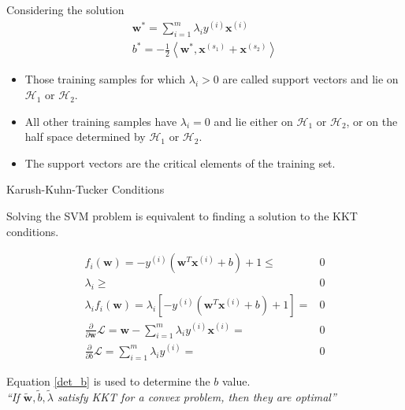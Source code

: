 \documentclass{beamer}
\begin{document}
\begin{frame}
    Considering the solution~\cite{Gunn1998}
    $$
    \begin{array}{l}
        \mathbf{w}^* = \sum\limits^m_{i=1} \lambda_i y^{(i)}
        \mathbf{x}^{(i)} \\[.4cm]
        b^* = - \frac{1}{2} \left< \mathbf{w}^*, \mathbf{x}^{(s_1)} + \mathbf{x}^{(s_2)}
        \right>
    \end{array}
    $$

    \begin{itemize} 
        \item Those training samples for which $\lambda_i > 0$ are called \alert{support
            vectors} and lie on $\mathcal{H}_1$ or $\mathcal{H}_2$.
        \item All other training samples have $\lambda_i = 0$ and lie either on
            $\mathcal{H}_1$ or $\mathcal{H}_2$, or on the half space determined by
            $\mathcal{H}_1$ or $\mathcal{H}_2$.
        \item The support vectors are the \alert{critical elements} of the training set.
    \end{itemize} 
    
\end{frame}


\begin{frame}{Karush-Kuhn-Tucker Conditions}

    Solving the SVM problem is equivalent to finding a solution to the KKT conditions.
    \cite{Burges1998}
    
    \vspace{-.3cm}
    \begin{eqnarray}
        f_i(\mathbf{w}) = - y^{(i)} (\mathbf{w}^T \mathbf{x}^{(i)} + b) + 1  \le & 0
        \nonumber\\
        \lambda_i  \ge & 0 \nonumber\\
        \lambda_i f_i(\mathbf{w}) = \lambda_i \left[ -y^{(i)} (\mathbf{w}^T
            \mathbf{x}^{(i)} + b) + 1 \right]  = & 0 \label{det_b}\\
        \frac{\partial}{\partial \mathbf{w}} \mathcal{L} = \mathbf{w} -
        \sum\limits^m_{i=1} \lambda_i  y^{(i)} \mathbf{x}^{(i)}  = & 0\nonumber\\
        \frac{\partial}{\partial b} \mathcal{L} = \sum\limits^m_{i=1} \lambda_i y^{(i)} =
        & 0\nonumber
    \end{eqnarray}

    Equation \eqref{det_b} is used to determine the $b$ value.\\[.3cm]

    \emph{\colorbox{blue!20!white}{``If $\tilde{\mathbf{w}}, \tilde{b}, \tilde{\lambda}$ satisfy
    KKT for a convex problem, then they are optimal''}}

\end{frame}
\end{document}
